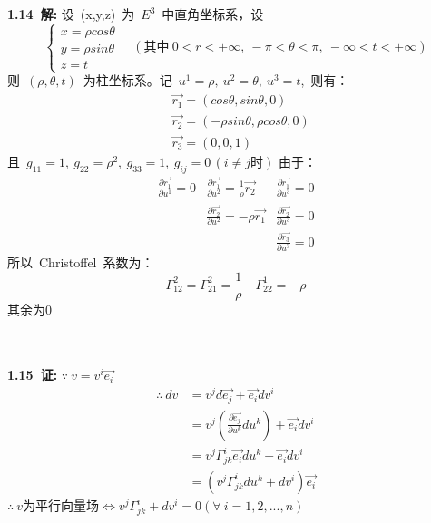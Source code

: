 \noindent
\\
\\
{\textbf{1.14\ 解:}}
设\ (x,y,z)\ 为\ $E^3$\ 中直角坐标系，设
\begin{displaymath}
\left\lbrace  
\begin{array}{l}
	x=\rho cos \theta
	\\
	y=\rho sin \theta
	\\
	z=t
\end{array}
\right.
     \quad(\text{其中}\ 0<r<+\infty ,\ -\pi <\theta <\pi ,\ -\infty <t<+\infty )
\end{displaymath}
则\ $(\rho ,\theta ,t)$\ 为柱坐标系。记\ $u^1=\rho ,\ u^2=\theta,\ u^3=t$,\ 则有：
\begin{align*}
&\overrightarrow{r_1}=(cos\theta ,sin\theta ,0)
\\
&\overrightarrow{r_2}=(-\rho sin\theta ,\rho cos\theta ,0)
\\
&\overrightarrow{r_3}=(0,0,1)
\end{align*}
且\ $g_{11}=1,\ g_{22}=\rho^2,\ g_{33}=1,\ g_{ij}=0\,(i\neq j\text{时})$
由于：
\begin{displaymath}
\begin{array}{ccc}
	\frac{\partial \overrightarrow{r_1}}{\partial u^1}=0  & 
	\frac{\partial \overrightarrow{r_1}}{\partial u^2}=\frac{1}{\rho}\overrightarrow{r_2}  &
	\frac{\partial \overrightarrow{r_1}}{\partial u^3}=0
	\\
	 &
	\frac{\partial \overrightarrow{r_2}}{\partial u^2}=-\rho \overrightarrow{r_1} &
	\frac{\partial \overrightarrow{r_2}}{\partial u^3}=0
	\\
	 &
	 &
	\frac{\partial \overrightarrow{r_3}}{\partial u^3}=0
\end{array}
\end{displaymath}
所以\ Christoffel\ 系数为：
$$\varGamma^2_{12}=\varGamma^2_{21}=\frac{1}{\rho}\quad\varGamma^1_{22}=-\rho $$
其余为0


\noindent
\\
\\
{\textbf{1.15\ 证:}}
$\because\ v=v^i\overrightarrow{e_i}$
\begin{align*}
\therefore\ dv&=v^jd\overrightarrow{e_j}+\overrightarrow{e_i}dv^i
              \\
              &=v^j(\frac{\partial \overrightarrow{e_j}}{\partial u^k}du^k)+\overrightarrow{e_i}dv^i
              \\
              &=v^j\varGamma^i_{jk}\overrightarrow{e_i}du^k+\overrightarrow{e_i}dv^i
              \\
              &=(v^j\varGamma^i_{jk}du^k+dv^i)\overrightarrow{e_i}
\end{align*}
$\therefore\ v\text{为平行向量场}\Leftrightarrow v^j\varGamma^i_{jk}+dv^i=0(\forall\ i=1,2,...,n)$

